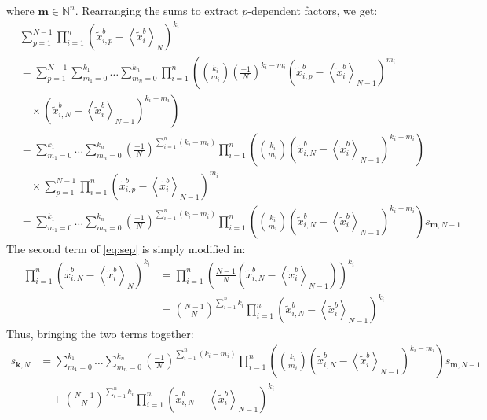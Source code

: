 \documentclass[12pt]{scrartcl}
\begin{document}
where $\mathbf{m} \in \mathbb{N}^n$. Rearranging the sums to extract $p$-dependent factors, we get:
\begin{align}
&   \sum_{p=1}^{N-1} \prod_{i=1}^n \left(\widetilde{x}^b_{i,p} - \left\langle \widetilde{x}^b_i \right\rangle_N\right)^{k_i} \nonumber \\
& = \sum_{p=1}^{N-1} \sum_{m_1=0}^{k_1} \dots \sum_{m_n=0}^{k_n} \prod_{i=1}^n \left(\binom{k_i}{m_i} \left(\frac{-1}{N}\right)^{k_i-m_i} \left(\widetilde{x}^b_{i,p} - \left\langle \widetilde{x}^b_i \right\rangle_{N-1}\right)^{m_i} \right. \nonumber \\
& \quad \times  \left. \left(\widetilde{x}^b_{i,N} - \left\langle \widetilde{x}^b_i \right\rangle_{N-1}\right)^{k_i-m_i} \right) \nonumber \\
& = \sum_{m_1=0}^{k_1} \dots \sum_{m_n=0}^{k_n} \left(\frac{-1}{N}\right)^{\sum_{i=1}^n (k_i-m_i)} \prod_{i=1}^n \left(\binom{k_i}{m_i} \left(\widetilde{x}^b_{i,N} - \left\langle \widetilde{x}^b_i \right\rangle_{N-1}\right)^{k_i-m_i} \right) \nonumber \\
& \quad \times \sum_{p=1}^{N-1} \prod_{i=1}^n \left(\widetilde{x}^b_{i,p} - \left\langle \widetilde{x}^b_i \right\rangle_{N-1}\right)^{m_i} \nonumber \\
& = \sum_{m_1=0}^{k_1} \dots \sum_{m_n=0}^{k_n} \left(\frac{-1}{N}\right)^{\sum_{i=1}^n (k_i-m_i)} \prod_{i=1}^n \left(\binom{k_i}{m_i} \left(\widetilde{x}^b_{i,N} - \left\langle \widetilde{x}^b_i \right\rangle_{N-1}\right)^{k_i-m_i} \right) s_{\mathbf{m},N-1}
\end{align}
The second term of \eqref{eq:sep} is simply modified in:
\begin{align}
\prod_{i=1}^n \left(\widetilde{x}^b_{i,N} - \left\langle \widetilde{x}^b_i \right\rangle_N\right)^{k_i} & = \prod_{i=1}^n \left(\frac{N-1}{N} \left(\widetilde{x}^b_{i,N} - \left\langle \widetilde{x}^b_i \right\rangle_{N-1}\right)\right)^{k_i} \nonumber \\
& = \left(\frac{N-1}{N}\right)^{\sum_{i=1}^n k_i} \prod_{i=1}^n \left(\widetilde{x}^b_{i,N} - \left\langle \widetilde{x}^b_i \right\rangle_{N-1}\right)^{k_i} 
\end{align}
Thus, bringing the two terms together:
\begin{align}
\label{eq:som_rec}
s_{\mathbf{k},N} & = \sum_{m_1=0}^{k_1} \dots \sum_{m_n=0}^{k_n} \left(\frac{-1}{N}\right)^{\sum_{i=1}^n (k_i-m_i)} \prod_{i=1}^n \left(\binom{k_i}{m_i} \left(\widetilde{x}^b_{i,N} - \left\langle \widetilde{x}^b_i \right\rangle_{N-1}\right)^{k_i-m_i} \right) s_{\mathbf{m},N-1} \nonumber \\
& \quad + \left(\frac{N-1}{N}\right)^{\sum_{i=1}^n k_i} \prod_{i=1}^n \left(\widetilde{x}^b_{i,N} - \left\langle \widetilde{x}^b_i \right\rangle_{N-1}\right)^{k_i}
\end{align}
\end{document}
